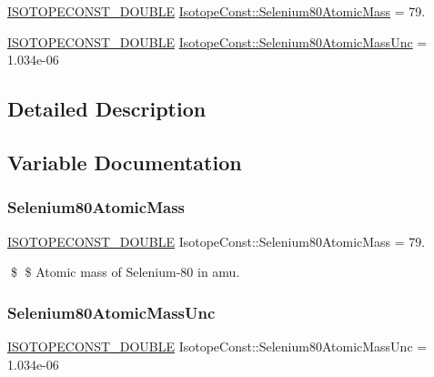 \begin{DoxyCompactItemize}
\item 
\mbox{\hyperlink{group___isotope_const-_macros_ga8f45a7272ce02c0b4c65c44636ed719a}{I\+S\+O\+T\+O\+P\+E\+C\+O\+N\+S\+T\+\_\+\+D\+O\+U\+B\+LE}} \mbox{\hyperlink{group___isotope_const-_selenium-_se80_ga32e48fb12f4d132c56e9dad7fa1f2fef}{Isotope\+Const\+::\+Selenium80\+Atomic\+Mass}} = 79.
\item 
\mbox{\hyperlink{group___isotope_const-_macros_ga8f45a7272ce02c0b4c65c44636ed719a}{I\+S\+O\+T\+O\+P\+E\+C\+O\+N\+S\+T\+\_\+\+D\+O\+U\+B\+LE}} \mbox{\hyperlink{group___isotope_const-_selenium-_se80_gab16b3d64779289f238eac695f4662e45}{Isotope\+Const\+::\+Selenium80\+Atomic\+Mass\+Unc}} = 1.\+034e-\/06
\end{DoxyCompactItemize}


\subsection{Detailed Description}


\subsection{Variable Documentation}
\mbox{\label{group___isotope_const-_selenium-_se80_ga32e48fb12f4d132c56e9dad7fa1f2fef}} 
\subsubsection{\texorpdfstring{Selenium80\+Atomic\+Mass}{Selenium80AtomicMass}}
{\footnotesize\ttfamily \mbox{\hyperlink{group___isotope_const-_macros_ga8f45a7272ce02c0b4c65c44636ed719a}{I\+S\+O\+T\+O\+P\+E\+C\+O\+N\+S\+T\+\_\+\+D\+O\+U\+B\+LE}} Isotope\+Const\+::\+Selenium80\+Atomic\+Mass = 79.}

\$ \$ Atomic mass of Selenium-\/80 in amu. \mbox{\label{group___isotope_const-_selenium-_se80_gab16b3d64779289f238eac695f4662e45}} 
\subsubsection{\texorpdfstring{Selenium80\+Atomic\+Mass\+Unc}{Selenium80AtomicMassUnc}}
{\footnotesize\ttfamily \mbox{\hyperlink{group___isotope_const-_macros_ga8f45a7272ce02c0b4c65c44636ed719a}{I\+S\+O\+T\+O\+P\+E\+C\+O\+N\+S\+T\+\_\+\+D\+O\+U\+B\+LE}} Isotope\+Const\+::\+Selenium80\+Atomic\+Mass\+Unc = 1.\+034e-\/06}

